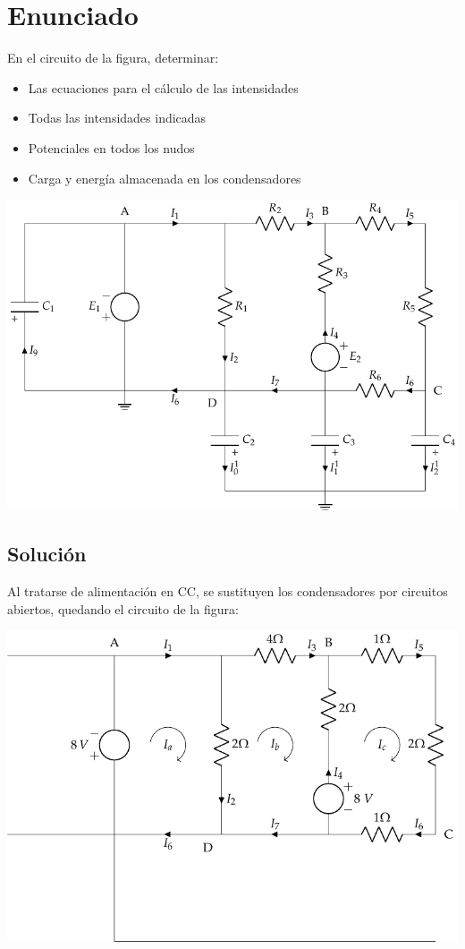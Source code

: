 \section{Enunciado}
En el circuito de la figura, determinar:
\begin{itemize}
\item Las ecuaciones para el cálculo de las intensidades
\item Todas las intensidades indicadas
\item Potenciales en todos los nudos
\item Carga y energía almacenada en los condensadores
\end{itemize}

\begin{center}
  \includegraphics{figuras/BT1_11.pdf}
\end{center}


\subsection*{Solución}
Al tratarse de alimentación en CC, se sustituyen los condensadores por
circuitos abiertos, quedando el circuito de la figura:
\begin{center}
  \includegraphics{figuras/BT1_11_mod.pdf}
\end{center}

